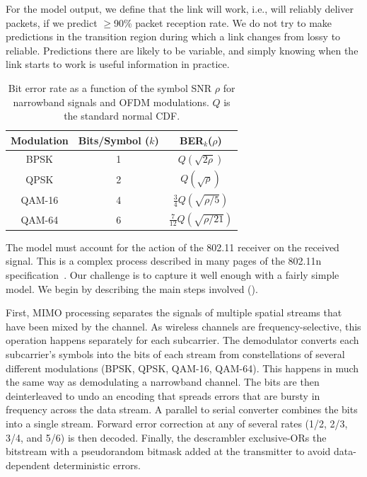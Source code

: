 For the model output, we define that the link will work, i.e., will reliably deliver packets, if we predict $\geq$90\% packet reception rate. We do not try to make predictions in the transition region during which a link changes from lossy to reliable. Predictions there are likely to be variable, and simply knowing when the link starts to work is useful information in practice.

\begin{table}
\centering
\begin{tabular}{ccc}
\toprule
Modulation & Bits/Symbol ($k$) & BER$_k$($\rho$) \\
\midrule BPSK & 1 & $Q\left(\sqrt{2\rho}\right)$ \\
QPSK & 2 & $Q\left(\sqrt{\rho}\right)$\\
QAM-16 & 4 & $\frac{3}{4}Q\left(\sqrt{\rho/5}\right)$\\
QAM-64 & 6 & $\frac{7}{12}Q\left(\sqrt{\rho/21}\right)$\\
\bottomrule
\end{tabular}
\caption{\label{tab:ber_snr}Bit error rate as a function of the symbol SNR $\rho$ for narrowband signals and OFDM modulations. $Q$ is the standard normal CDF\@.}
\end{table}


The model must account for the action of the 802.11 receiver on the received signal. This is a complex process described in many pages of the 802.11n specification~\cite{80211n}. Our challenge is to capture it well enough with a fairly simple model. We begin by describing the main steps involved ().

First, MIMO processing separates the signals of multiple spatial streams that have been mixed by the channel. As wireless channels are frequency-selective, this operation happens separately for each subcarrier. The demodulator converts each subcarrier's symbols into the bits of each stream from constellations of several different modulations (BPSK, QPSK, QAM-16, QAM-64). This happens in much the same way as demodulating a narrowband channel. The bits are then deinterleaved to undo an encoding that spreads errors that are bursty in frequency across the data stream. A parallel to serial converter combines the bits into a single stream. Forward error correction at any of several rates (1/2, 2/3, 3/4, and 5/6) is then decoded. Finally, the descrambler exclusive-ORs the bitstream with a pseudorandom bitmask added at the transmitter to avoid data-dependent deterministic errors.


